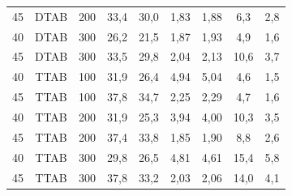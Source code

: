 \begin{table}
{\begin{tabular}{ccccccccc}
    			45 & DTAB & 200 & 33,4 & 30,0 & 1,83 & 1,88 & 6,3 &	2,8\\
    			40 & DTAB & 300 & 26,2 & 21,5 & 1,87 & 1,93 & 4,9 &	1,6\\
    			45 & DTAB & 300 & 33,5 & 29,8 & 2,04 & 2,13 & 10,6 & 3,7\\
    			\midrule
    			40 & TTAB & 100 & 31,9 & 26,4 & 4,94 & 5,04 & 4,6 &	1,5\\
    			45 & TTAB & 100 & 37,8 & 34,7 & 2,25 & 2,29 & 4,7 &	1,6\\
    			40 & TTAB & 200 & 31,9 & 25,3 & 3,94 & 4,00 & 10,3 & 3,5\\
    			45 & TTAB & 200 & 37,4 & 33,8 & 1,85 & 1,90 & 8,8 &	2,6\\
    			40 & TTAB & 300 & 29,8 & 26,5 & 4,81 & 4,61 & 15,4 & 5,8\\
    			45 & TTAB & 300 & 37,8 & 33,2 & 2,03 & 2,06 & 14,0 & 4,1\\
                \bottomrule
                \end{tabular}}%
            {}
        \end{table}
        
